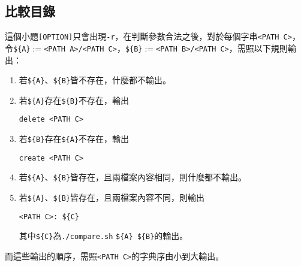 \subsection{比較目錄}

\newcommand{\A}{\texttt{\$\{A\}}}
\newcommand{\B}{\texttt{\$\{B\}}}
這個小題\texttt{[OPTION]}只會出現\texttt{-r}，在判斷參數合法之後，對於每個字串\texttt{<PATH C>}，令\A$:=$\texttt{<PATH A>/<PATH C>}，\B$:=$\texttt{<PATH B>/<PATH C>}，需照以下規則輸出：
\begin{enumerate}
\item 若\A 、\B 皆不存在，什麼都不輸出。
\item 若\A 存在\B 不存在，輸出
\begin{lstlisting}
delete <PATH C>
\end{lstlisting}
\item 若\B 存在\A 不存在，輸出
\begin{lstlisting}
create <PATH C>
\end{lstlisting}
\item 若\A 、\B 皆存在，且兩檔案內容相同，則什麼都不輸出。
\item 若\A 、\B 皆存在，且兩檔案內容不同，則輸出
\begin{lstlisting}
<PATH C>: ${C}
\end{lstlisting}
其中\texttt{\$\{C\}}為\texttt{./compare.sh} \A\ \B 的輸出。
\end{enumerate}
而這些輸出的順序，需照\texttt{<PATH C>}的字典序由小到大輸出。

